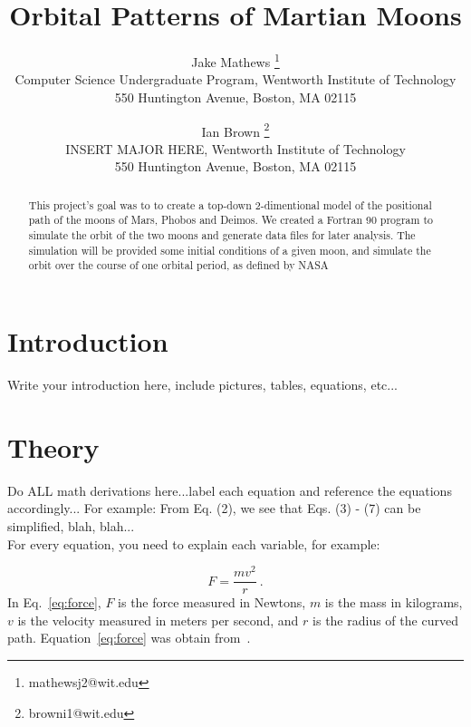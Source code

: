 \documentclass[11pt]{article}
\begin{document}
\title{\textbf{Orbital Patterns of Martian Moons}}

\author{Jake Mathews
\thanks{mathewsj2@wit.edu}\\
Computer Science Undergraduate Program, Wentworth Institute of Technology\\
550 Huntington Avenue, Boston, MA 02115\\
\and Ian Brown
\thanks{browni1@wit.edu}\\
INSERT MAJOR HERE, Wentworth Institute of Technology\\
550 Huntington Avenue, Boston, MA 02115}

\maketitle

\begin{abstract}

This project's goal was to to create a top-down 2-dimentional model
of the positional path of the moons of Mars, Phobos and Deimos.
We created a Fortran 90 program to simulate the orbit of the two moons
and generate data files for later analysis.
The simulation will be provided some initial conditions of a given moon,
and simulate the orbit over the course of one orbital period, as defined
by NASA~\cite{nasa}

\end{abstract}


\section{Introduction}
\noindent Write your introduction here, include pictures, tables, equations, etc...

\section{Theory}
\noindent Do ALL math derivations here...label each equation and reference the
equations accordingly... For example:  From Eq. (2), we see that Eqs. (3) - (7) 
can be simplified, blah, blah...\\

\noindent For every equation, you need to explain each variable, for example:

\begin{equation}
\label{eq:force}
F=\dfrac{mv^2}{r}~.
\end{equation}
\noindent In Eq.~\eqref{eq:force}, $F$ is the force measured in Newtons, $m$ is the
mass in kilograms, $v$ is the velocity measured in meters per second, and $r$ is
the radius of the curved path.  Equation~\eqref{eq:force} was obtain from~\cite{uni}.
\end{document}
